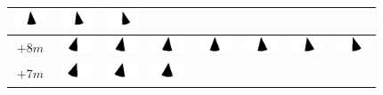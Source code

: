 \begin{tabular}{|c|c|c|c|c|c|c|c|}
	\includegraphics[width=1cm]{img_Bereich/V1_img_res_Winkel_X_1000_9000.png}&
	\includegraphics[width=1cm]{img_Bereich/V1_img_res_Winkel_X_2000_9000.png}&
	\includegraphics[width=1cm]{img_Bereich/V1_img_res_Winkel_X_3000_9000.png}\\ 
	\hline 
	$+8m$ &
	\includegraphics[width=1cm]{img_Bereich/V1_img_res_Winkel_X_-3000_8000.png} &
	\includegraphics[width=1cm]{img_Bereich/V1_img_res_Winkel_X_-2000_8000.png}&
	\includegraphics[width=1cm]{img_Bereich/V1_img_res_Winkel_X_-1000_8000.png}&
	\includegraphics[width=1cm]{img_Bereich/V1_img_res_Winkel_X_0_8000.png}&
	\includegraphics[width=1cm]{img_Bereich/V1_img_res_Winkel_X_1000_8000.png}&
	\includegraphics[width=1cm]{img_Bereich/V1_img_res_Winkel_X_2000_8000.png}&
	\includegraphics[width=1cm]{img_Bereich/V1_img_res_Winkel_X_3000_8000.png}\\ 
	\hline 
	$+7m$ &
	\includegraphics[width=1cm]{img_Bereich/V1_img_res_Winkel_X_-3000_7000.png} &
	\includegraphics[width=1cm]{img_Bereich/V1_img_res_Winkel_X_-2000_7000.png}&
	\includegraphics[width=1cm]{img_Bereich/V1_img_res_Winkel_X_-1000_7000.png}&

\end{tabular}
